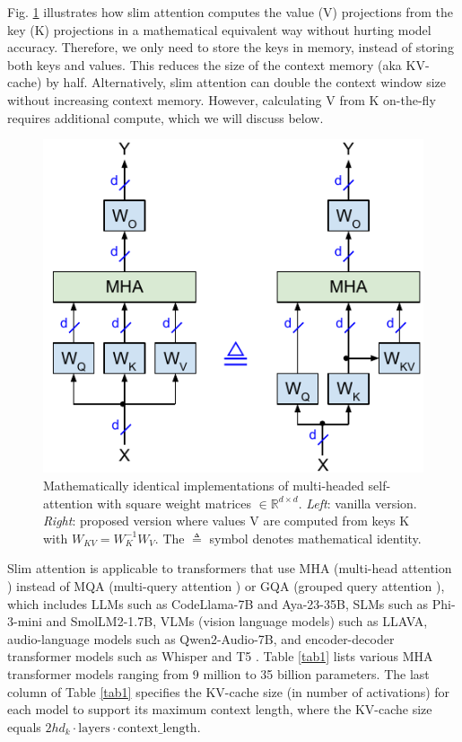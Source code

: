 \documentclass{article}
\newcommand{\eR}[2]{$\in \mathbb{R}^{#1 \times #2}$} %
\begin{document}
Fig. \ref{fig1} illustrates how slim attention computes the value (V) projections from the key (K) projections in a mathematical equivalent way without hurting model accuracy. Therefore, we only need to store the keys in memory, instead of storing both keys and values. This reduces the size of the context memory (aka KV-cache) by half. Alternatively, slim attention can double the context window size without increasing context memory. However, calculating V from K on-the-fly requires additional compute, which we will discuss below.
\begin{figure}[h!] \centering  %
  \includegraphics[scale=0.88]{../doc/fig/slimAttn_fig1.pdf}
  \caption{Mathematically identical implementations of multi-headed self-attention with square weight matrices \eR{d}{d}. \emph{Left}: vanilla version. \emph{Right}: proposed version where values V are computed from keys K with $W_{KV} = W_K^{-1} W_V$. The $\triangleq$ symbol denotes mathematical identity.}
\label{fig1} \end{figure}

Slim attention is applicable to transformers that use MHA (multi-head attention \citep{vanilla}) instead of MQA (multi-query attention \citep{MQA}) or GQA (grouped query attention \citep{GQA}), which includes LLMs such as CodeLlama-7B and Aya-23-35B, SLMs such as Phi-3-mini and SmolLM2-1.7B, VLMs (vision language models) such as LLAVA, audio-language models such as Qwen2-Audio-7B, and encoder-decoder transformer models such as Whisper \citep{whisper} and T5 \citep{T5}. Table \ref{tab1} lists various MHA transformer models ranging from 9 million to 35 billion parameters. The last column of Table \ref{tab1} specifies the KV-cache size (in number of activations) for each model to support its maximum context length, where the KV-cache size equals $2 h d_k \cdot \text{layers} \cdot \text{context\_length}$.
\end{document}
